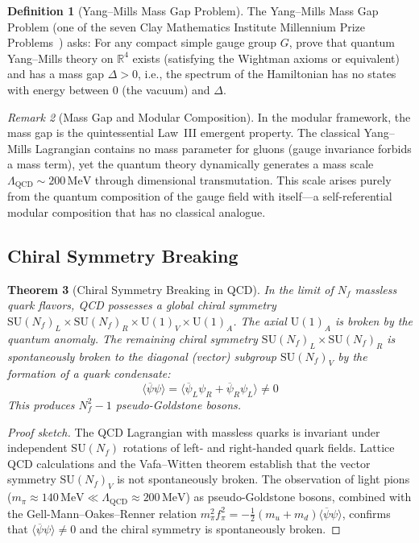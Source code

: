 \documentclass[12pt]{article}
\newtheorem{theorem}{Theorem}[section]
\theoremstyle{definition}
\newtheorem{definition}[theorem]{Definition}
\theoremstyle{remark}
\newtheorem{remark}[theorem]{Remark}
\newcommand{\psibar}{\overline{\psi}}
\newcommand{\MeV}{\,\mathrm{MeV}}
\begin{document}
\begin{definition}[Yang--Mills Mass Gap Problem]
\label{def:massgap}
The Yang--Mills Mass Gap Problem (one of the seven Clay Mathematics Institute Millennium Prize Problems~\cite{ClayYM}) asks: For any compact simple gauge group $G$, prove that quantum Yang--Mills theory on $\mathbb{R}^4$ exists (satisfying the Wightman axioms or equivalent) and has a mass gap $\Delta > 0$, i.e., the spectrum of the Hamiltonian has no states with energy between $0$ (the vacuum) and $\Delta$.
\end{definition}

\begin{remark}[Mass Gap and Modular Composition]
\label{rem:massgap}
In the modular framework, the mass gap is the quintessential Law~III emergent property. The classical Yang--Mills Lagrangian contains no mass parameter for gluons (gauge invariance forbids a mass term), yet the quantum theory dynamically generates a mass scale $\Lambda_{\mathrm{QCD}} \sim 200\MeV$ through dimensional transmutation. This scale arises purely from the quantum composition of the gauge field with itself---a self-referential modular composition that has no classical analogue.
\end{remark}

\subsection{Chiral Symmetry Breaking}

\begin{theorem}[Chiral Symmetry Breaking in QCD]
\label{thm:chiralsb}
In the limit of $N_f$ massless quark flavors, QCD possesses a global chiral symmetry $\mathrm{SU}(N_f)_L \times \mathrm{SU}(N_f)_R \times \mathrm{U}(1)_V \times \mathrm{U}(1)_A$. The axial $\mathrm{U}(1)_A$ is broken by the quantum anomaly. The remaining chiral symmetry $\mathrm{SU}(N_f)_L \times \mathrm{SU}(N_f)_R$ is spontaneously broken to the diagonal (vector) subgroup $\mathrm{SU}(N_f)_V$ by the formation of a quark condensate:
\begin{equation}
\langle \psibar \psi \rangle = \langle \psibar_L \psi_R + \psibar_R \psi_L \rangle \neq 0
\end{equation}
This produces $N_f^2 - 1$ pseudo-Goldstone bosons.
\end{theorem}

\begin{proof}[Proof sketch]
The QCD Lagrangian with massless quarks is invariant under independent $\mathrm{SU}(N_f)$ rotations of left- and right-handed quark fields. Lattice QCD calculations and the Vafa--Witten theorem establish that the vector symmetry $\mathrm{SU}(N_f)_V$ is not spontaneously broken. The observation of light pions ($m_\pi \approx 140\MeV \ll \Lambda_{\mathrm{QCD}} \approx 200\MeV$) as pseudo-Goldstone bosons, combined with the Gell-Mann--Oakes--Renner relation $m_\pi^2 f_\pi^2 = -\frac{1}{2}(m_u + m_d)\langle\psibar\psi\rangle$, confirms that $\langle\psibar\psi\rangle \neq 0$ and the chiral symmetry is spontaneously broken.
\end{proof}
\end{document}
